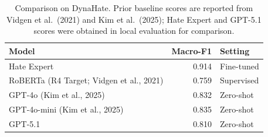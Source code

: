 
\begin{table}[htbp]
\centering
\caption{Comparison on DynaHate. Prior baseline scores are reported from Vidgen et al.\ (2021) and Kim et al.\ (2025); Hate Expert and GPT-5.1 scores were obtained in local evaluation for comparison.}
\label{tab:dynahate-benchmark-comparison}
\small
\begin{tabular}{p{7.2cm} r p{2.3cm}}
\toprule
Model & Macro-F1 & Setting \\
\midrule
Hate Expert & 0.914 & Fine-tuned \\
RoBERTa (R4 Target; Vidgen et al., 2021) & 0.759 & Supervised \\
GPT-4o (Kim et al., 2025) & 0.832 & Zero-shot \\
GPT-4o-mini (Kim et al., 2025) & 0.835 & Zero-shot \\
GPT-5.1 & 0.810 & Zero-shot \\
\bottomrule
\end{tabular}
\end{table}
